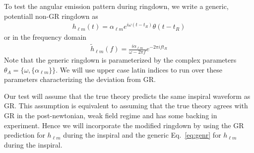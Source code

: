 \documentclass[aps,prd,amsmath,showpacs,amssymb,superscriptaddress,nofootinbib,longbibliography,eqsecnum,preprintnumbers]{revtex4-1}
\newcommand{\Ys}{{}_{-2}Y_{\ell m}}
\newcommand{\zach}[1]{\textcolor{ForestGreen}{#1}}
\begin{document}
To test the angular emission pattern during ringdown, we write a generic, potentiall non-GR ringdown as
\begin{align}
h_{\ell m}(t)=\alpha_{\ell m}e^{i\omega (t-t_R)} \theta(t-t_R) \label{eq:genr}
\end{align}
or in the frequency domain
\begin{align}
\tilde h_{\ell m}(f)=\frac{i\alpha_{\ell m}}{\omega -2\pi f}e^{-2\pi i ft_R}
\end{align}
Note that the generic ringdown is parameterized by the complex parameters ${\theta_A}=\{\omega,\{\alpha_{\ell m}\}\}$. We will use upper case latin indices to run over these parameters characterizing the deviation from GR.

Our test will assume that the true theory predicts the same inspiral waveform as GR. This assumption is equivalent to assuming that the true theory agrees with GR in the post-newtonian, weak field regime and has some backing in experiment. Hence we will incorporate the modified ringdown by using the GR prediction for $h_{\ell m}$ during the inspiral and the generic Eq.~\eqref{eq:genr} for $h_{\ell m}$ during the inspiral.
\end{document}
